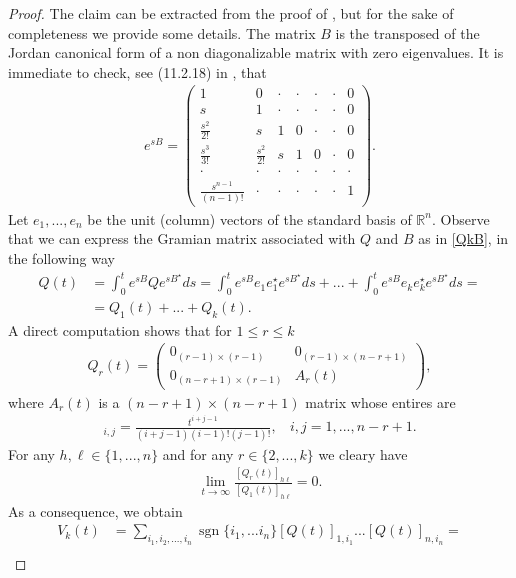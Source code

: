 \documentclass[11pt,letter]{amsart}
\newcommand{\Rn}{\mathbb R^n}
\numberwithin{equation}{section}
\numberwithin{equation}{section}
\begin{document}
\begin{proof}
\noindent The claim can be extracted from the proof of \cite[Ex.2, p.287]{Ku2}, but for the sake of completeness we provide some details. The matrix $B$ is the transposed of the Jordan canonical form of a non diagonalizable matrix with zero eigenvalues. It is immediate to check, see (11.2.18) in \cite{Bernie}, that
\begin{align*}
e^{sB}=\begin{pmatrix}
1 & 0 & \cdot & \cdot & \cdot & \cdot & 0 \\
s & 1 & \cdot & \cdot & \cdot & \cdot &  0 \\
\frac{s^{2}}{2!} & s & 1 & 0 & \cdot & \cdot  & 0\\
\frac{s^{3}}{3!} & \frac{s^{2}}{2!} & s & 1 & 0  & \cdot & 0\\
\cdot & \cdot & \cdot & \cdot & \cdot & \cdot & \cdot\\
\frac{s^{n-1}}{(n-1)!} & \cdot & \cdot & \cdot & \cdot & \cdot& 1
\end{pmatrix}.
\end{align*}
Let $e_1,...,e_n$ be the unit (column) vectors of the standard basis of $\Rn$. Observe that we can express the Gramian matrix associated with $Q$ and $B$ as in \eqref{QkB}, in the following way
\begin{align*}
Q(t)&=\int_{0}^{t}e^{sB}Qe^{sB^{\star}}ds=\int_{0}^{t}e^{sB}e_{1}e_{1}^{\star}e^{sB^{\star}}ds+...+\int_{0}^{t}e^{sB}e_{k}e_{k}^{\star}e^{sB^{\star}}ds=\\
&=Q_{1}(t)+...+Q_{k}(t).
\end{align*}
A direct computation shows that for $1\le r \le k$
\begin{align*}
Q_{r}(t)=\begin{pmatrix}
0_{(r-1)\times(r-1)} & 0_{(r-1)\times(n-r+1)}\\
0_{(n-r+1)\times(r-1)} & A_{r}(t)
\end{pmatrix},
\end{align*}
where $A_{r}(t)$ is a $(n-r+1)\times(n-r+1)$ matrix whose entires are
\begin{align*}
[A_{r}(t)]_{i,j}=\frac{t^{i+j-1}}{(i+j-1)(i-1)!(j-1)!}, \ \ \ \ i,j=1,...,n-r+1.
\end{align*}
For any $h,\ell \in \{1,...,n\}$ and for any $r\in \{2,...,k\}$ we cleary have
\begin{align*}
\lim\limits_{t\to \infty} \frac{[Q_{r}(t)]_{h\ell}}{[Q_{1}(t)]_{h\ell}}=0.
\end{align*}
As a consequence, we obtain
\begin{align*}
V_k(t) &= \sum_{i_{1},i_{2},...,i_{n}} \operatorname{sgn}\{i_{1},...i_{n}\}[Q(t)]_{1,i_{1}}...[Q(t)]_{n,i_{n}}=\\

\end{align*}
\end{proof}
\end{document}
